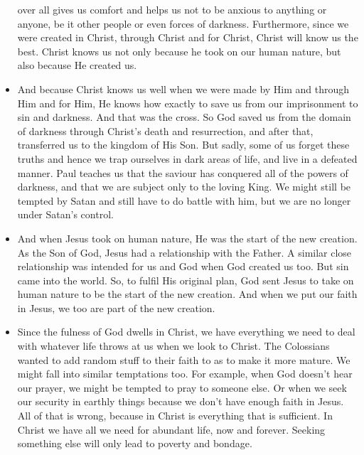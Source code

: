\begin{itemize}
{  over all gives us comfort and helps us not to be anxious to anything or
  anyone, be it other people or even forces of darkness.  Furthermore, since
  we were created in Christ, through Christ and for Christ, Christ will know
  us the best.  Christ knows us not only because he took on our human nature,
  but also because He created us.}
  \item{And because Christ knows us well when we were made by Him and through
  Him and for Him, He knows how exactly to save us from our imprisonment to
  sin and darkness.  And that was the cross.  So God saved us from the domain
  of darkness through Christ's death and resurrection, and after that,
  transferred us to the kingdom of His Son.  But sadly, some of us forget
  these truths and hence we trap ourselves in dark areas of life, and live in
  a defeated manner.  Paul teaches us that the saviour has conquered all of
  the powers of darkness, and that we are subject only to the loving King.
  We might still be tempted by Satan and still have to do battle with him,
  but we are no longer under Satan's control.}
  \item{And when Jesus took on human nature, He was the start of the new
  creation.  As the Son of God, Jesus had a relationship with the Father.  A
  similar close relationship was intended for us and God when God created us
  too.  But sin came into the world.  So, to fulfil His original plan, God
  sent Jesus to take on human nature to be the start of the new creation.
  And when we put our faith in Jesus, we too are part of the new creation.}
  \item{Since the fulness of God dwells in Christ, we have everything we need
  to deal with whatever life throws at us when we look to Christ.  The
  Colossians wanted to add random stuff to their faith to as to make it more
  mature.  We might fall into similar temptations too.  For example, when God
  doesn't hear our prayer, we might be tempted to pray to someone else.  Or
  when we seek our security in earthly things because we don't have enough
  faith in Jesus.  All of that is wrong, because in Christ is everything that
  is sufficient. In Christ we have all we need for abundant life, now and forever. Seeking something else will only lead to poverty and bondage. }
\end{itemize}